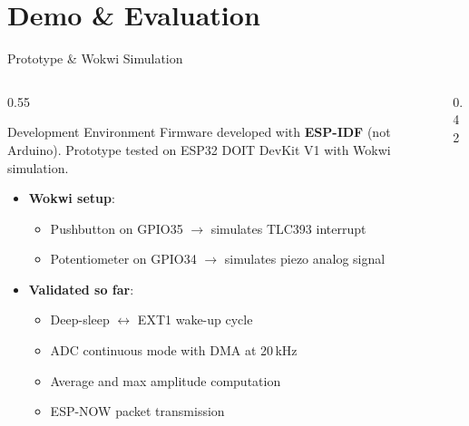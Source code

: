 \section{Demo \& Evaluation}

\begin{frame}{Prototype \& Wokwi Simulation}
\begin{columns}[T,onlytextwidth]
\begin{column}{0.55\textwidth}
\begin{block}{Development Environment}
Firmware developed with \textbf{ESP-IDF} (not Arduino). Prototype tested on ESP32 DOIT DevKit V1 with Wokwi simulation.
\end{block}
\vspace{0.2cm}
\begin{itemize}
\item \textbf{Wokwi setup}:
  \begin{itemize}
  \item Pushbutton on GPIO35 $\rightarrow$ simulates TLC393 interrupt
  \item Potentiometer on GPIO34 $\rightarrow$ simulates piezo analog signal
  \end{itemize}
\item \textbf{Validated so far}:
  \begin{itemize}
  \item Deep-sleep $\leftrightarrow$ EXT1 wake-up cycle
  \item ADC continuous mode with DMA at 20\,kHz
  \item Average and max amplitude computation
  \item ESP-NOW packet transmission
  \end{itemize}
\end{itemize}
\end{column}
\begin{column}{0.42\textwidth}
\centering
{}
\end{column}
\end{columns}
\end{frame}

